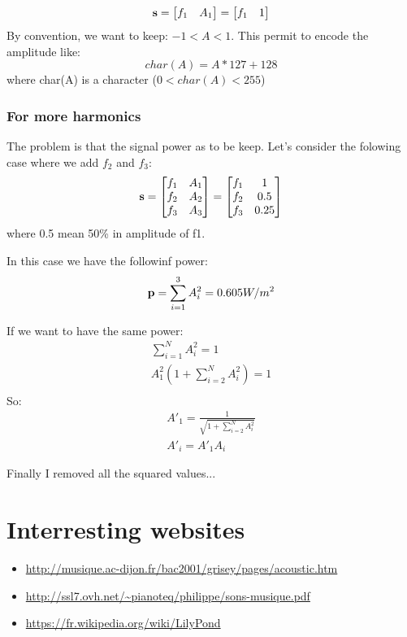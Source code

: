 \documentclass{article}
\begin{document}
\begin{equation}
\mathbf{s} = \begin{bmatrix}
f_1 & A_1
\end{bmatrix}
=
\begin{bmatrix}
f_1 & 1
\end{bmatrix}
\end{equation}
By convention, we want to keep: $-1<A<1$. This permit to encode the amplitude like:
\begin{equation}
char(A)=A*127+128
\end{equation}
where char(A) is a character ($0<char(A)<255$)

\subsubsection*{For more harmonics}

The problem is that the signal power as to be keep. Let's consider the folowing case where we add $f_2$ and $f_3$:
\begin{align}
\mathbf{s}
= \begin{bmatrix}
f_1 & A_1 \\
f_2 & A_2 \\
f_3 & A_3 \\
\end{bmatrix}
= \begin{bmatrix}
f_1 & 1 \\
f_2 & 0.5 \\
f_3 & 0.25 \\
\end{bmatrix} \nonumber \\ 
\end{align}
where 0.5 mean 50\% in amplitude of f1.

In this case we have the followinf power:
\begin{equation}
\mathbf{p} = \sum_{i=1}^3 A_i^2 = 0.605 W/m^2
\end{equation}

If we want to have the same power:
\begin{align}
\sum_{i=1}^N A_i^2 =1 \\
A_1^2 (1+\sum_{i=2}^N A_i^2) =1 \\
\end{align}
So:
\begin{align}
A'_1=\frac{1}{\sqrt{1+\sum_{i=2}^N A_i^2}} \\
A'_i = A'_1  A_i
\end{align}

Finally I removed all the squared values...

\section{Interresting websites}

\begin{itemize}
\item \url{http://musique.ac-dijon.fr/bac2001/grisey/pages/acoustic.htm}
\item \url{http://ssl7.ovh.net/~pianoteq/philippe/sons-musique.pdf}
\item \url{https://fr.wikipedia.org/wiki/LilyPond}
\end{itemize}
\end{document}
